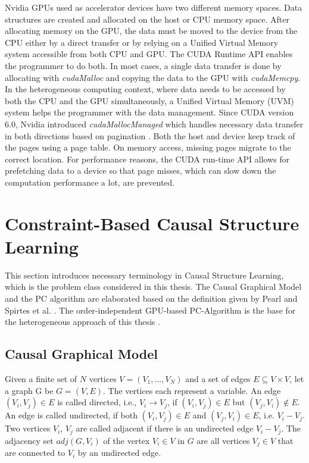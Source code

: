 Nvidia GPUs used as accelerator devices have two different memory spaces. Data structures are created and allocated on the host or CPU memory space. After allocating memory on the GPU, the data must be moved to the device from the CPU either by a direct transfer or by relying on a Unified Virtual Memory system accessible from both CPU and GPU. The CUDA Runtime API enables the programmer to do both. In most cases, a single data transfer is done by allocating with \emph{cudaMalloc} and copying the data to the GPU with \emph{cudaMemcpy}. In the heterogeneous computing context, where data needs to be accessed by both the CPU and the GPU simultaneously, a Unified Virtual Memory (UVM) system helps the programmer with the data management. Since CUDA version 6.0, Nvidia introduced \emph{cudaMallocManaged} which handles necessary data transfer in both directions based on pagination \cite{gayatriComparingManagedMemory}. Both the host and device keep track of the pages using a page table. On memory access, missing pages migrate to the correct location.
For performance reasons, the CUDA run-time API allows for prefetching data to a device so that page misses, which can slow down the computation performance a lot, are prevented.


\section{Constraint-Based Causal Structure Learning}
This section introduces necessary terminology in Causal Structure Learning, which is the problem class considered in this thesis. The Causal Graphical Model and the PC algorithm are elaborated based on the definition given by Pearl \cite{pearlCausality2009} and Spirtes et al. \cite{spirtesCausationPredictionSearch1993}. The order-independent GPU-based PC-Algorithm is the base for the heterogeneous approach of this thesis \cite{schmidtOrderIndependentConstraintBasedCausal2018}.

\subsection{Causal Graphical Model}
Given a finite set of $N$ vertices $V = (V_1,...,V_N)$ and a set of edges $E \subseteq V \times V$, let a graph G be $G = (V,E)$. The vertices each represent a variable. An edge $(V_i, V_j) \in E$ is called directed, i.e., $V_i \rightarrow V_j$, if $(V_i,V_j) \in E$ but $(V_j, V_i) \notin E$. An edge is called undirected, if both $(V_i,V_j) \in E$ and $(V_j, V_i) \in E$, i.e. $V_i - V_j$. Two vertices $V_i$, $V_j$ are called adjacent if there is an undirected edge $V_i - V_j$. The adjacency set $adj(G, V_i)$ of the vertex $V_i \in V$ in $G$ are all vertices $V_j \in V$ that are connected to $V_i$ by an undirected edge.

